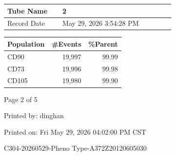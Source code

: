 \documentclass[UTF8,10pt,a4paper,fontset=fandol]{ctexart}
\newcommand{\fieldvalue}[1]{#1}
\begin{document}
\bigskip

\begin{center}
\small
\begin{tabular}{|p{0.28\linewidth}|p{0.58\linewidth}|}
\hline
Tube Name &
\fieldvalue{2}\\
\hline
Record Date &
\fieldvalue{May 29, 2026 3:54:28 PM}\\
\hline
\end{tabular}

\medskip

\begin{tabular}{|p{0.28\linewidth}|r|r|}
\hline
Population & \#Events & \%Parent\\
\hline
CD90 &
\fieldvalue{19,997} &
\fieldvalue{99.99}\\
\hline
CD73 &
\fieldvalue{19,996} &
\fieldvalue{99.98}\\
\hline
CD105 &
\fieldvalue{19,980} &
\fieldvalue{99.90}\\
\hline
\end{tabular}
\end{center}

\vfill

\begin{flushright}
Page 2 of 5

Printed by: dinghan

Printed on: Fri May 29, 2026 04:02:00 PM CST
\end{flushright}

\newpage

\begin{center}
C304-20260529-Pheno Type-A372Z20120605030
\end{center}

\begin{center}
\end{center}
\end{document}
